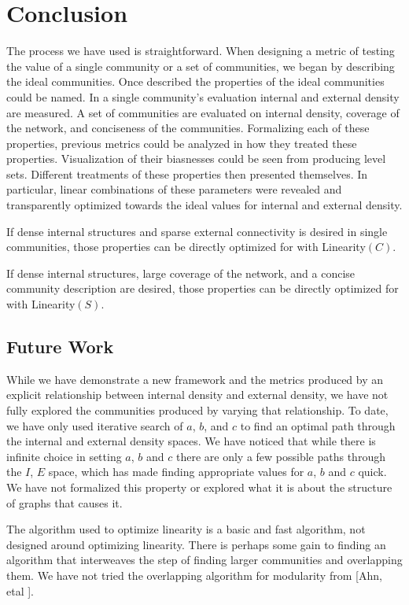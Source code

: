 \documentclass[conference]{IEEEtran}
\begin{document}
\section{Conclusion}

The process we have used is straightforward.  When designing a metric of testing the value of a single community or a set of communities, we began by describing the ideal communities.  Once described the properties of the ideal communities could be named.  In a single community's evaluation internal and external density are measured.  A set of communities are evaluated on internal density, coverage of the network, and conciseness of the communities.  Formalizing each of these properties, previous metrics could be analyzed in how they treated these properties.  Visualization of their biasnesses could be seen from producing level sets.  Different treatments of these properties then presented themselves.  In particular, linear combinations of these parameters were revealed and transparently optimized towards the ideal values for internal and external density.

If dense internal structures and sparse external connectivity is desired in single communities, those properties can be directly optimized for with {\sc Linearity}$(C)$.

If dense internal structures, large coverage of the network, and a concise community description are desired, those properties can be directly optimized for with {\sc Linearity}$(S)$.


\subsection{Future Work}

While we have demonstrate a new framework and the metrics produced by an explicit relationship between internal density and external density, we have not fully explored the communities produced by varying that relationship.  To date, we have only used iterative search of $a$, $b$, and $c$ to find an optimal path through the internal and external density spaces.  We have noticed that while there is infinite choice in setting $a$, $b$ and $c$ there are only a few possible paths through the $I$, $E$ space, which has made finding appropriate values for $a$, $b$ and $c$ quick.  We have not formalized this property or explored what it is about the structure of graphs that causes it.

The algorithm used to optimize linearity is a basic and fast algorithm, not designed around optimizing linearity.  There is perhaps some gain to finding an algorithm that interweaves the step of finding larger communities and overlapping them.  We have not tried the overlapping algorithm for modularity from [Ahn, etal ].
\end{document}
